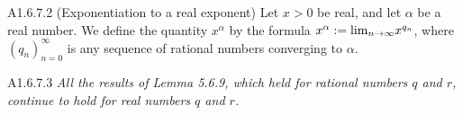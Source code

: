 \begin{definition}{A1.6.7.2}
    (Exponentiation to a real exponent) Let $x > 0$ be real, and let $\alpha$ be
    a real number. We define the quantity $x^\alpha$ by the formula $x^\alpha := \text{lim}_{n \rightarrow \infty}{x^{q_n}}$,
    where $(q_n)_{n=0}^{\infty}$ is any sequence of rational numbers converging to $\alpha$.
\end{definition}

\begin{proposition}{A1.6.7.3}
    \emph{All the results of Lemma 5.6.9, which held for rational numbers $q$ and
    $r$, continue to hold for real numbers $q$ and $r$.}
\end{proposition}
